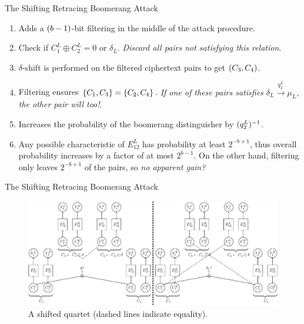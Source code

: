 \documentclass[notheorems]{beamer}
\theoremstyle{definition}
\theoremstyle{example}
\begin{document}
    \begin{frame}[<+->]{The Shifting Retracing Boomerang Attack}
        \begin{enumerate}
            \item Adds a \((b - 1)\)-bit filtering in the middle of the
            attack procedure.
            \item Check if \(C_1^L \oplus C_2^L = 0 \textrm{ or } \delta_L\).
            \emph{Discard all pairs not satisfying this relation}.
            \item \(\delta\)-shift is performed on the filtered ciphertext pairs
            to get \((C_3, C_4)\).
            \item Filtering ensures \(\{C_1, C_3\} = \{C_2, C_4\}\).
            \emph{If one of these pairs satisfies \(\delta_L \xrightarrow{q_2^L}
            \mu_L\), the other pair will too!}.
            \item Increases the probability of the boomerang distinguisher by
            \((q_2^L)^{-1}\).
            \item Any possible characteristic of \(E_{12}^L\) has probability at
            least \(2^{-b + 1}\), thus overall probability increases by a factor
            of at most \(2^{b - 1}\). On the other hand, filtering only leaves
            \(2^{-b + 1}\) of the pairs, so \emph{no apparent gain?}
        \end{enumerate}
    \end{frame}

    \begin{frame}{The Shifting Retracing Boomerang Attack}
        \begin{figure}
            \centering
            \includegraphics[width=\columnwidth]{images/shifting_boomerang.png}
            \caption{A shifted quartet (dashed lines indicate equality).}
        \end{figure}
    \end{frame}
\end{document}
